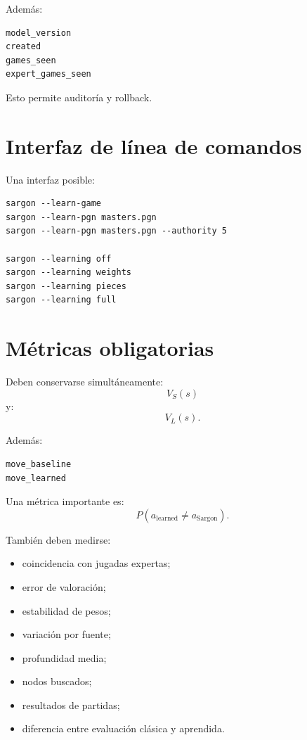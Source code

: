 \documentclass[11pt,a4paper]{article}
\begin{document}
Además:
\begin{lstlisting}
model_version
created
games_seen
expert_games_seen
\end{lstlisting}

Esto permite auditoría y rollback.

\section{Interfaz de línea de comandos}
Una interfaz posible:
\begin{lstlisting}
sargon --learn-game
sargon --learn-pgn masters.pgn
sargon --learn-pgn masters.pgn --authority 5

sargon --learning off
sargon --learning weights
sargon --learning pieces
sargon --learning full
\end{lstlisting}

\section{Métricas obligatorias}
Deben conservarse simultáneamente:
\[
V_S(s)
\]
y:
\[
V_L(s).
\]

Además:
\begin{lstlisting}
move_baseline
move_learned
\end{lstlisting}

Una métrica importante es:
\[
P
\left(
a_{\text{learned}}
\neq
a_{\text{Sargon}}
\right).
\]

También deben medirse:

\begin{itemize}
    \item coincidencia con jugadas expertas;
    \item error de valoración;
    \item estabilidad de pesos;
    \item variación por fuente;
    \item profundidad media;
    \item nodos buscados;
    \item resultados de partidas;
    \item diferencia entre evaluación clásica y aprendida.
\end{itemize}
\end{document}

